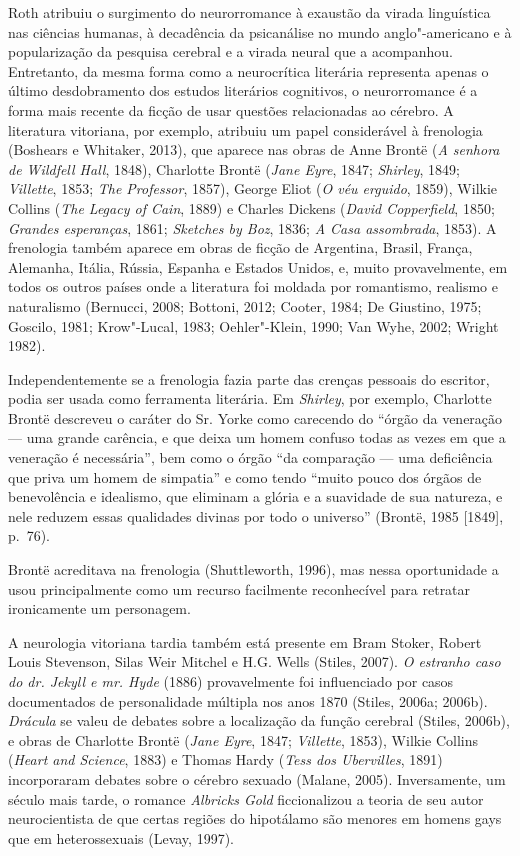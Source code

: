 Roth atribuiu o surgimento do neurorromance à exaustão da virada
linguística nas ciências humanas, à decadência da psicanálise no mundo
anglo"-americano e à popularização da pesquisa cerebral e a virada neural
que a acompanhou. Entretanto, da mesma forma como a neurocrítica
literária representa apenas o último desdobramento dos estudos
literários cognitivos, o neurorromance é a forma mais recente da ficção
de usar questões relacionadas ao cérebro. A literatura vitoriana, por
exemplo, atribuiu um papel considerável à frenologia (Boshears e
Whitaker, 2013), que aparece nas obras de Anne Brontë (\emph{A senhora
de Wildfell Hall}, 1848), Charlotte Brontë (\emph{Jane Eyre}, 1847;
\emph{Shirley}, 1849; \emph{Villette}, 1853; \emph{The Professor},
1857), George Eliot (\emph{O véu erguido}, 1859), Wilkie Collins
(\emph{The Legacy of Cain}, 1889) e Charles Dickens (\emph{David
Copperfield}, 1850; \emph{Grandes esperanças}, 1861; \emph{Sketches by
Boz}, 1836; \emph{A Casa assombrada}, 1853). A frenologia também aparece em
obras de ficção de Argentina, Brasil, França, Alemanha, Itália, Rússia,
Espanha e Estados Unidos, e, muito provavelmente, em todos os outros
países onde a literatura foi moldada por romantismo, realismo e
naturalismo (Bernucci, 2008; Bottoni, 2012; Cooter, 1984; De Giustino,
1975; Goscilo, 1981; Krow"-Lucal, 1983; Oehler"-Klein, 1990; Van Wyhe,
2002; Wright 1982).

Independentemente se a frenologia fazia parte das crenças pessoais do
escritor, podia ser usada como ferramenta literária. Em \emph{Shirley},
por exemplo, Charlotte Brontë descreveu o caráter do Sr. Yorke como
carecendo do ``órgão da veneração --- uma grande carência, e que deixa um homem 
confuso todas as vezes em que a veneração é necessária'', bem como o
órgão ``da comparação --- uma deficiência que priva um homem de
simpatia'' e como tendo ``muito pouco dos órgãos de benevolência e
idealismo, que eliminam a glória e a suavidade de sua natureza, e nele
reduzem essas qualidades divinas por todo o universo'' (Brontë, 1985
{[}1849{]}, p.~76).

Brontë acreditava na frenologia (Shuttleworth, 1996), mas nessa
oportunidade a usou principalmente como um recurso facilmente
reconhecível para retratar ironicamente um personagem.

A neurologia vitoriana tardia também está presente em Bram Stoker,
Robert Louis Stevenson, Silas Weir Mitchel e H.G. Wells (Stiles, 2007).
\emph{O estranho caso do dr. Jekyll e mr. Hyde} (1886) provavelmente foi
influenciado por casos documentados de personalidade múltipla nos anos
1870 (Stiles, 2006a; 2006b). \emph{Drácula} se valeu de debates sobre a
localização da função cerebral (Stiles, 2006b), e obras de Charlotte
Brontë (\emph{Jane Eyre}, 1847; \emph{Villette}, 1853), Wilkie Collins
(\emph{Heart and Science}, 1883) e Thomas Hardy (\emph{Tess dos
Ubervilles}, 1891) incorporaram debates sobre o cérebro sexuado (Malane,
2005). Inversamente, um século mais tarde, o romance \emph{Albricks
Gold} ficcionalizou a teoria de seu autor neurocientista de que certas
regiões do hipotálamo são menores em homens gays que em heterossexuais
(Levay, 1997).


